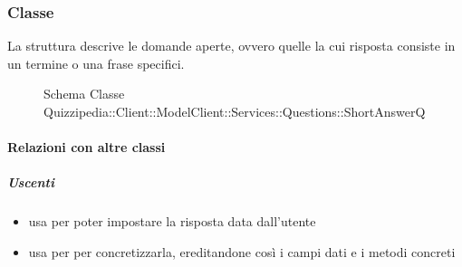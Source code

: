 \subsubsection{Classe }
La struttura descrive le domande aperte, ovvero quelle la cui risposta consiste in un termine o una frase specifici.
\begin{figure}[H]
\centering
\noindent{}
\caption[Schema Classe ShortAnswerQ]{Schema Classe Quizzipedia::Client::ModelClient::Services::Questions::ShortAnswerQ}
\end{figure}
\paragraph{Relazioni con altre classi}
\subparagraph{Uscenti}
\begin{itemize}
\item usa  per poter impostare la risposta data dall'utente
\item usa  per per concretizzarla, ereditandone così i campi dati e i metodi concreti
\end{itemize}

